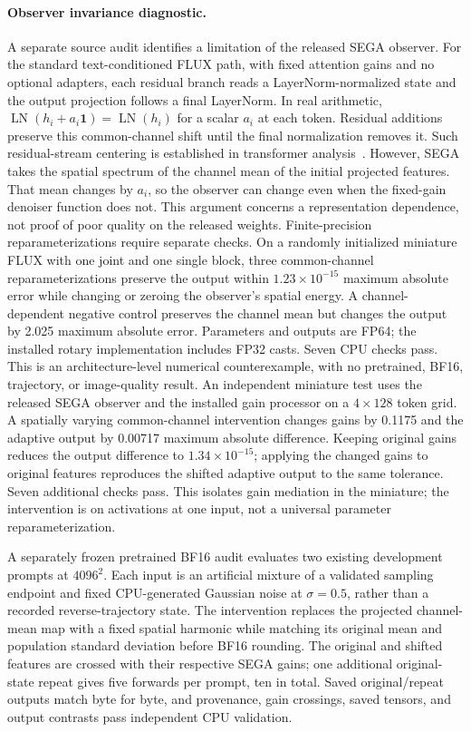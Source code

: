 \paragraph{Observer invariance diagnostic.}
A separate source audit identifies a limitation of the released SEGA observer.
For the standard text-conditioned FLUX path, with fixed attention gains and no
optional adapters, each residual branch reads a LayerNorm-normalized state and
the output projection follows a final LayerNorm. In real arithmetic,
$\operatorname{LN}(h_i+a_i\mathbf{1})=\operatorname{LN}(h_i)$ for a scalar $a_i$
at each token. Residual additions preserve this common-channel shift until the
final normalization removes it. Such residual-stream centering is established
in transformer analysis~\citep{transformerlenscentering}.
However, SEGA takes the spatial spectrum of the channel mean of the initial
projected features. That mean changes by $a_i$, so the observer can change even
when the fixed-gain denoiser function does not. This argument concerns a
representation dependence, not proof of poor quality on the released weights.
Finite-precision reparameterizations require separate checks.
On a randomly initialized miniature FLUX with one joint and one single block,
three common-channel reparameterizations preserve the output within
$1.23\times10^{-15}$ maximum absolute error while changing or zeroing the
observer's spatial energy. A channel-dependent negative control preserves the
channel mean but changes the output by 2.025 maximum absolute error.
Parameters and outputs are FP64; the installed rotary implementation includes
FP32 casts. Seven CPU checks pass. This is an architecture-level numerical
counterexample, with no pretrained, BF16, trajectory, or image-quality result.
An independent miniature test uses the released SEGA observer and the installed
gain processor on a $4\times128$ token grid. A spatially varying common-channel
intervention changes gains by 0.1175 and the adaptive output by 0.00717 maximum
absolute difference. Keeping original gains reduces the output difference to
$1.34\times10^{-15}$; applying the changed gains to original features reproduces
the shifted adaptive output to the same tolerance. Seven additional checks
pass. This isolates gain mediation in the miniature; the intervention is on
activations at one input, not a universal parameter reparameterization.

A separately frozen pretrained BF16 audit evaluates two existing development
prompts at $4096^2$. Each input is an artificial mixture of a validated sampling
endpoint and fixed CPU-generated Gaussian noise at $\sigma=0.5$, rather than a
recorded reverse-trajectory state. The intervention replaces the projected
channel-mean map with a fixed spatial harmonic while matching its original
mean and population standard deviation before BF16 rounding. The original and
shifted features are crossed with their respective SEGA gains; one additional
original-state repeat gives five forwards per prompt, ten in total. Saved
original/repeat outputs match byte for byte, and provenance, gain crossings,
saved tensors, and output contrasts pass independent CPU validation.

